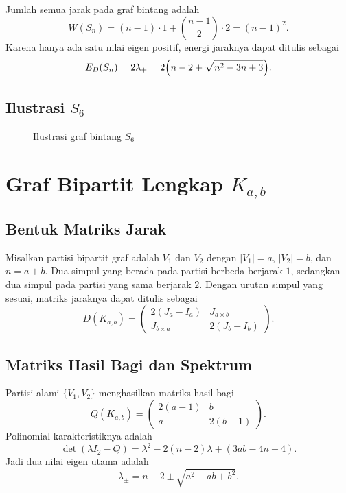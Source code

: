 \documentclass[12pt,a4paper]{article}
\begin{document}
Jumlah semua jarak pada graf bintang adalah
\[
  W(S_n)
  =(n-1)\cdot 1+\binom{n-1}{2}\cdot 2
  =(n-1)^2.
\]
Karena hanya ada satu nilai eigen positif, energi jaraknya dapat ditulis sebagai
\[
  E_D(S_n)=2\lambda_+
  =2\Bigl(n-2+\sqrt{n^2-3n+3}\Bigr).
\]

\subsection{Ilustrasi $S_6$}

\begin{figure}[h!]
  \centering
  \caption{Ilustrasi graf bintang $S_6$}
  \label{fig:s6}
\end{figure}

\section{Graf Bipartit Lengkap $K_{a,b}$}

\subsection{Bentuk Matriks Jarak}

Misalkan partisi bipartit graf adalah $V_1$ dan $V_2$ dengan $|V_1|=a$, $|V_2|=b$, dan $n=a+b$. Dua simpul yang berada pada partisi berbeda berjarak $1$, sedangkan dua simpul pada partisi yang sama berjarak $2$. Dengan urutan simpul yang sesuai, matriks jaraknya dapat ditulis sebagai
\[
  D(K_{a,b})=
  \begin{pmatrix}
    2(J_a-I_a)    & J_{a\times b} \\
    J_{b\times a} & 2(J_b-I_b)
  \end{pmatrix}.
\]

\subsection{Matriks Hasil Bagi dan Spektrum}

Partisi alami $\{V_1,V_2\}$ menghasilkan matriks hasil bagi
\[
  Q(K_{a,b})=
  \begin{pmatrix}
    2(a-1) & b      \\
    a      & 2(b-1)
  \end{pmatrix}.
\]
Polinomial karakteristiknya adalah
\[
  \det(\lambda I_2-Q)
  =
  \lambda^2-2(n-2)\lambda+(3ab-4n+4).
\]
Jadi dua nilai eigen utama adalah
\[
  \lambda_{\pm}
  =
  n-2\pm \sqrt{a^2-ab+b^2}.
\]
\end{document}
